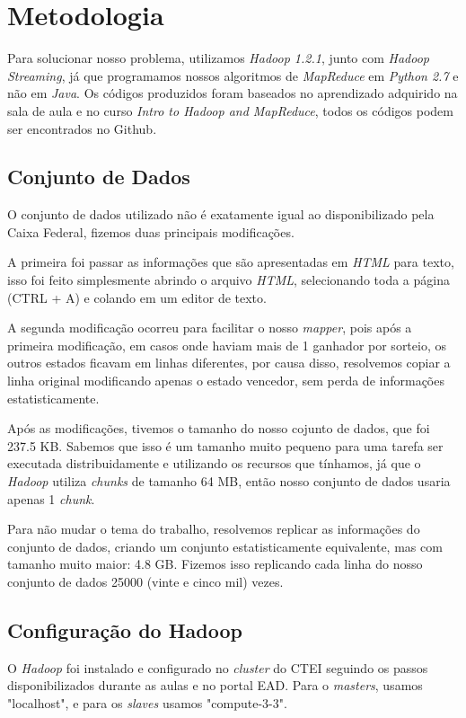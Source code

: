 \documentclass[a4paper,10pt]{article}
\begin{document}
\section{Metodologia}
Para solucionar nosso problema, utilizamos \textit{Hadoop 1.2.1}, junto com \textit{Hadoop Streaming}, já que programamos nossos algoritmos de \textit{MapReduce} em \textit{Python 2.7} e não em \textit{Java}. Os códigos produzidos foram baseados no aprendizado adquirido na sala de aula e no curso \textit{Intro to Hadoop and MapReduce}\cite{udacity}, todos os códigos podem ser encontrados no Github\cite{github}.

\subsection{Conjunto de Dados}
O conjunto de dados utilizado não é exatamente igual ao disponibilizado pela Caixa Federal\cite{megasena}, fizemos duas principais modificações.

A primeira foi passar as informações que são apresentadas em \textit{HTML} para texto, isso foi feito simplesmente abrindo o arquivo \textit{HTML}, selecionando toda a página (CTRL + A) e colando em  um editor de texto.

A segunda modificação ocorreu para facilitar o nosso \textit{mapper}, pois após a primeira modificação, em casos onde haviam mais de 1 ganhador por sorteio, os outros estados ficavam em linhas diferentes, por causa disso, resolvemos copiar a linha original modificando apenas o estado vencedor, sem perda de informações estatisticamente.

Após as modificações, tivemos o tamanho do nosso cojunto de dados, que foi 237.5 KB. Sabemos que isso é um tamanho muito pequeno para uma tarefa ser executada distribuidamente e utilizando os recursos que tínhamos, já que o \textit{Hadoop} utiliza \textit{chunks} de tamanho 64 MB, então nosso conjunto de dados usaria apenas 1 \textit{chunk}.

Para não mudar o tema do trabalho, resolvemos replicar as informações do conjunto de dados, criando um conjunto estatisticamente equivalente, mas com tamanho muito maior: 4.8 GB. Fizemos isso replicando cada linha do nosso conjunto de dados 25000 (vinte e cinco mil) vezes.

\subsection{Configuração do Hadoop}
O \textit{Hadoop} foi instalado e configurado no \textit{cluster} do CTEI seguindo os passos disponibilizados durante as aulas e no portal EAD. Para o \textit{masters}, usamos "localhost", e para os \textit{slaves} usamos "compute-3-3".
\end{document}
